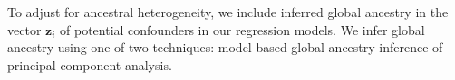 \documentclass[12pt]{article}
\begin{document}
To adjust for ancestral heterogeneity, we include inferred global ancestry in the vector $\mathbf{z}_i$ of potential confounders in our regression models. We infer global ancestry using one of two techniques: model-based global ancestry inference of principal component analysis.


%
%
\end{document}

